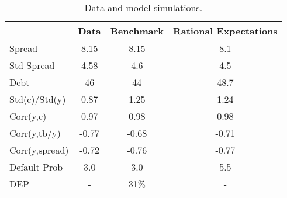 \begin{table}[!hbtp]\centering \small
\caption{Data and model simulations.}\label{table:data_simulations}
\begin{tabular}{@{}lccc@{}} \toprule
 & \textbf{Data} & \multicolumn{1}{c}{\textbf{Benchmark}} & \multicolumn{1}{g}{\textbf{Rational Expectations}} \\\midrule
Spread                   & 8.15            & 8.15            & 8.1            \\
Std Spread               & 4.58            & 4.6            & 4.5            \\
Debt                     & 46          & 44           & 48.7           \\
Std(c)/Std(y)            & 0.87            & 1.25           & 1.24           \\
Corr(y,c)                & 0.97           & 0.98           & 0.98           \\
Corr(y,tb/y)             & -0.77          & -0.68           & -0.71          \\
Corr(y,spread)           & -0.72        & -0.76           & -0.77          \\
Default Prob             & 3.0            & 3.0            & 5.5            \\
DEP                      & -              & 31\%           & -           \\
\bottomrule
\end{tabular}
\end{table}

